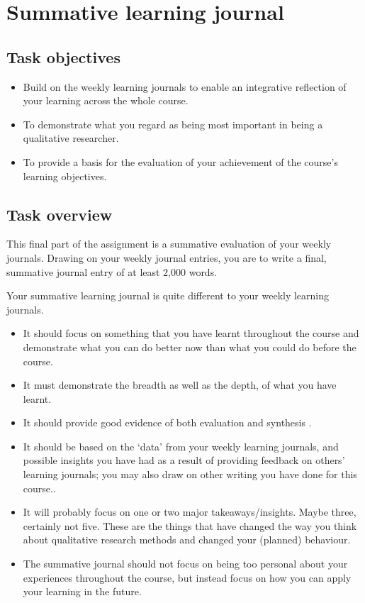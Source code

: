 \documentclass[]{book}
\providecommand{\tightlist}{%
  \setlength{\itemsep}{0pt}\setlength{\parskip}{0pt}}
\theoremstyle{definition}
\theoremstyle{definition}
\theoremstyle{definition}
\theoremstyle{remark}
\begin{document}
\hypertarget{ass3}{%
\section{Summative learning journal}\label{ass3}}

\hypertarget{task-objectives-2}{%
\subsection*{Task objectives}\label{task-objectives-2}}

\begin{itemize}
\item
  Build on the weekly learning journals to enable an integrative
  reflection of your learning across the whole course.
\item
  To demonstrate what you regard as being most important in being a
  qualitative researcher.
\item
  To provide a basis for the evaluation of your achievement of the
  course's learning objectives.
\end{itemize}

\hypertarget{task-overview-2}{%
\subsection*{Task overview}\label{task-overview-2}}

This final part of the assignment is a summative evaluation of your
weekly journals. Drawing on your weekly journal entries, you are to
write a final, summative journal entry of at least 2,000 words.

Your summative learning journal is quite different to your weekly
learning journals.

\begin{itemize}
\tightlist
\item
  It should focus on something that you have learnt throughout the
  course and demonstrate what you can do better now than what you could
  do before the course.
\item
  It must demonstrate the breadth as well as the depth, of what you have
  learnt.
\item
  It should provide good evidence of both evaluation and synthesis
  \autocite{bloom_1956_taxonomyeducationalobjectives}.
\item
  It should be based on the `data' from your weekly learning journals,
  and possible insights you have had as a result of providing feedback
  on others' learning journals; you may also draw on other writing you
  have done for this course..
\item
  It will probably focus on one or two major takeaways/insights. Maybe
  three, certainly not five. These are the things that have changed the
  way you think about qualitative research methods and changed your
  (planned) behaviour.
\item
  The summative journal should not focus on being too personal about
  your experiences throughout the course, but instead focus on how you
  can apply your learning in the future.
\end{itemize}
\end{document}
